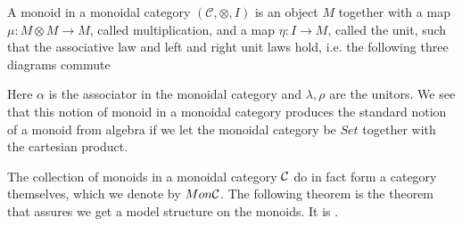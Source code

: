 \begin{definition}[Monoid]
A monoid in a monoidal category $ (\mathcal{C}, \otimes, I)$ is an object $ M$ together with a map $ \mu:M\otimes M\rightarrow M$, called multiplication, and a map $ \eta: I\rightarrow M$, called the unit, such that the associative law and left and right unit laws hold, i.e. the following three diagrams commute
\begin{center}
\end{center}

\begin{center}
\end{center}

\begin{center}
\end{center}
\end{definition}

Here $ \alpha$ is the associator in the monoidal category and $ \lambda, \rho$ are the unitors. We see that this notion of monoid in a monoidal category produces the standard notion of a monoid from algebra if we let the monoidal category be $Set$ together with the cartesian product. 

The collection of monoids in a monoidal category $\mathcal{C}$ do in fact form a category themselves, which we denote by $Mon\mathcal{C}$. The following theorem is the theorem that assures we get a model structure on the monoids. It is \cite[Theorem 4.1 (3)]{monoid}. 

